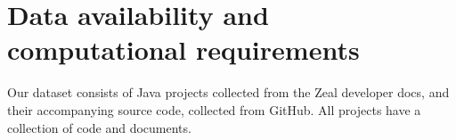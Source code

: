 \documentclass{article}
\begin{document}
\section{Data availability and computational requirements}

Our dataset consists of Java projects collected from the Zeal developer docs, and their accompanying source code, collected from GitHub. All projects have a collection of code and documents.



\end{document}
